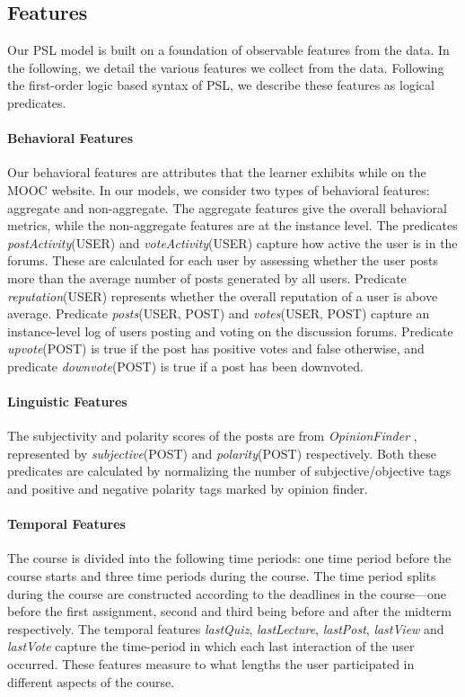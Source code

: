 \subsection{Features}
\label{sec:features}
Our PSL model is built on a foundation of observable features from the data. In the following, we detail the various features we collect from the data. Following the first-order logic based syntax of PSL, we describe these features as logical predicates.

\paragraph{Behavioral Features}

Our behavioral features are attributes that the learner exhibits while on the MOOC website. In our models, we consider two types of behavioral features: aggregate and non-aggregate. The aggregate features give the overall behavioral metrics, while the non-aggregate features are at the instance level. The predicates \textit{postActivity}(USER) and \textit{voteActivity}(USER) capture how active the user is in the forums. These are calculated for each user by assessing whether the user posts more than the average number of posts generated by all users. Predicate \textit{reputation}(USER) represents whether the overall reputation of a user is above average. Predicate \textit{posts}(USER, POST) and  \textit{votes}(USER, POST) capture an instance-level log of users posting and voting on the discussion forums. Predicate \textit{upvote}(POST) is true if the post has positive votes and false otherwise, and predicate \textit{downvote}(POST) is true if a post has been downvoted. 

\paragraph{Linguistic Features}
The subjectivity and polarity scores of the posts are from \emph{OpinionFinder} \cite{opinionfinder}, represented by \textit{subjective}(POST) and \textit{polarity}(POST) respectively. Both these predicates are calculated by normalizing the number of subjective/objective tags and positive and negative polarity tags marked by opinion finder.

\paragraph{Temporal Features}
The course is divided into the following time periods: one time period before the course starts and three time periods during the course. The time period splits during the course are constructed according to the deadlines in the course---one before the first assignment, second and third being before and after the midterm respectively. The temporal features \textit{lastQuiz}, \textit{lastLecture}, \textit{lastPost}, \textit{lastView} and \textit{lastVote} capture the time-period in which each last interaction of the user occurred. These features measure to what lengths the user participated in different aspects of the course.


